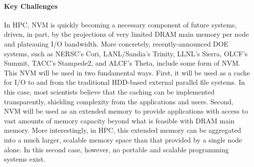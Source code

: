 
\paragraph{Key Challenges}
In HPC, NVM is quickly becoming a necessary component of future systems, driven, in part, by the projections of very limited DRAM main memory per node and plateauing I/O bandwidth. More concretely, recently-announced DOE systems, such as NERSC's Cori, LANL/Sandia's Trinity, LLNL's Sierra, OLCF's Summit, TACC's Stampede2, and ALCF's Theta, include some form of NVM. This NVM will be used in two fundamental ways. First, it will be used as a cache for I/O to and from the traditional HDD-based external parallel file systems. In this case, most scientists believe that the caching can be implemented transparently, shielding complexity from the applications and users. Second, NVM will be used as an extended memory to provide applications with access to vast amounts of memory capacity beyond what is feasible with DRAM main memory. More interestingly, in HPC, this extended memory can be aggregated into a much larger, scalable memory space than that provided by a single node alone. In this second case, however, no portable and scalable programming systems exist.

